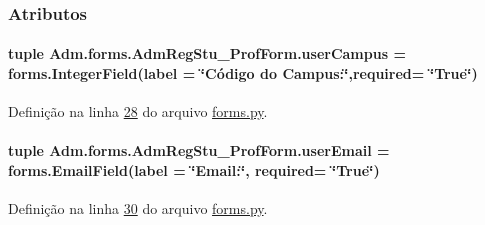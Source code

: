 \subsubsection{Atributos}
\hypertarget{classAdm_1_1forms_1_1AdmRegStu__ProfForm_a885786ae8be597f051f8e3ff65ddb02d}{}
\paragraph[{user\+Campus}]{\setlength{\rightskip}{0pt plus 5cm}tuple Adm.\+forms.\+Adm\+Reg\+Stu\+\_\+\+Prof\+Form.\+user\+Campus = forms.\+Integer\+Field(label = \char`\"{}Código do Campus\+:\char`\"{},required= \char`\"{}True\char`\"{})\hspace{0.3cm}{\ttfamily [static]}}\label{classAdm_1_1forms_1_1AdmRegStu__ProfForm_a885786ae8be597f051f8e3ff65ddb02d}


Definição na linha \hyperlink{Adm_2forms_8py_source_l00028}{28} do arquivo \hyperlink{Adm_2forms_8py_source}{forms.\+py}.

\hypertarget{classAdm_1_1forms_1_1AdmRegStu__ProfForm_a97ccca87a1c1c3a223e13d51e8196ef4}{}
\paragraph[{user\+Email}]{\setlength{\rightskip}{0pt plus 5cm}tuple Adm.\+forms.\+Adm\+Reg\+Stu\+\_\+\+Prof\+Form.\+user\+Email = forms.\+Email\+Field(label = \char`\"{}Email\+:\char`\"{}, required= \char`\"{}True\char`\"{})\hspace{0.3cm}{\ttfamily [static]}}\label{classAdm_1_1forms_1_1AdmRegStu__ProfForm_a97ccca87a1c1c3a223e13d51e8196ef4}


Definição na linha \hyperlink{Adm_2forms_8py_source_l00030}{30} do arquivo \hyperlink{Adm_2forms_8py_source}{forms.\+py}.

\hypertarget{classAdm_1_1forms_1_1AdmRegStu__ProfForm_a8cd50b9437effd2fecd6e4c66c307e41}{}
